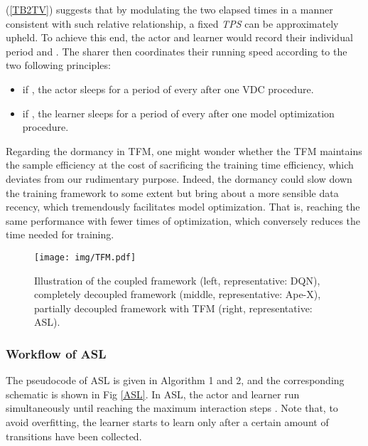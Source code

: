 \documentclass[journal]{IEEEtran}
\begin{document}
(\ref{TB2TV}) suggests that by modulating the two elapsed times in a manner consistent with such relative relationship, a fixed \textit{TPS} can be approximately upheld. To achieve this end, the actor and learner would record their individual period  and . The sharer then coordinates their running speed according to the two following principles:

\begin{itemize}
	\item{if , the actor sleeps for a period of  every after one VDC procedure.}
	
	\item{if , the learner sleeps for a period of  every after one model optimization procedure.}
\end{itemize}

Regarding the dormancy in TFM, one might wonder whether the TFM maintains the sample efficiency at the cost of sacrificing the training time efficiency, which deviates from our rudimentary purpose. Indeed, the dormancy could slow down the training framework to some extent but bring about a more sensible data recency, which tremendously facilitates model optimization. That is, reaching the same performance with fewer times of optimization, which conversely reduces the time needed for training.

\begin{figure}
	\centering
	\texttt{[image: img/TFM.pdf]}
	\caption{Illustration of the coupled framework (left, representative: DQN), completely decoupled framework (middle, representative: Ape-X), partially decoupled framework with TFM (right, representative: ASL).}
	\label{TFM}
\end{figure}

\subsubsection{Workflow of ASL}
The pseudocode of ASL is given in Algorithm 1 and 2, and the corresponding schematic is shown in Fig \ref{ASL}. In ASL, the actor and learner run simultaneously until reaching the maximum interaction steps . Note that, to avoid overfitting, the learner starts to learn only after a certain amount of transitions have been collected.
\end{document}

